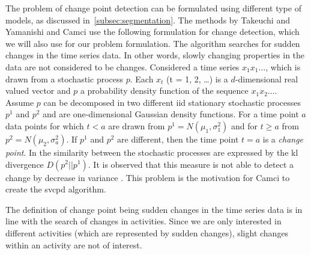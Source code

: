 The problem of change point detection can be formulated using different type of models, as discussed in~\ref{subsec:segmentation}.
The methods by Takeuchi and Yamanishi \cite{takeuchi2006unifying} and Camci \cite{camci2010change} use the following formulation for change detection, which we will also use for our problem formulation.
The algorithm searches for sudden changes in the time series data.
In other words, slowly changing properties in the data are not considered to be changes.
Considered a time series $x_1 x_1 \dots$, which is drawn from a stochastic process $p$.
Each $x_t$ (t = 1, 2, \dots) is a $d$-dimensional real valued vector and $p$ a probability density function of the sequence $x_1 x_2 \dots$.
Assume $p$ can be decomposed in two different \gls{iid} stationary stochastic processes $p^1$ and $p^2$ and are one-dimensional Gaussian density functions.
For a time point $a$ data points for which $t < a$ are drawn from $p^1 = N(\mu_1, \sigma_1^2)$ and for $t \geq a$ from $p^2 = N(\mu_2, \sigma_a^2)$.
If $p^1$ and $p^2$ are different, then the time point $t = a$ is a \emph{change point}.
In \cite{takeuchi2006unifying} the similarity between the stochastic processes are expressed by the \gls{kl} divergence $D(p^2||p^1)$.
It is observed that this measure is not able to detect a change by decrease in variance \cite{takeuchi2006unifying,camci2010change}.
This problem is the motivation for Camci \cite{camci2010change} to create the \gls{svcpd} algorithm.

The definition of change point being sudden changes in the time series data is in line with the search of changes in activities.
Since we are only interested in different activities (which are represented by sudden changes), slight changes within an activity are not of interest.




